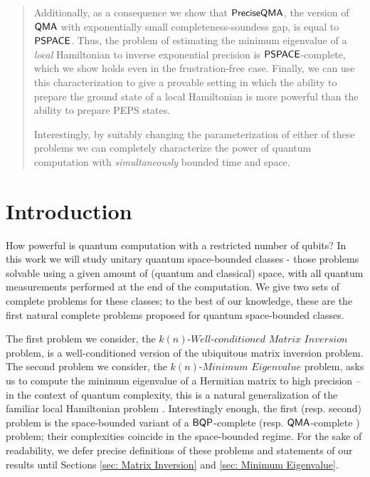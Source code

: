 \documentclass[11pt]{article}
\theoremstyle{definition}
\theoremstyle{remark}
\newcommand\QMA{{\sf{QMA}}}
\newcommand\PSPACE{{\sf{PSPACE}}}
\newcommand\BQP{{\sf{BQP}}}
\newcommand\preciseQMA{{\sf{PreciseQMA}}}
\newcommand\matrixinvert[1]{{\ensuremath{#1}}\textit{-Well-conditioned Matrix Inversion}}
\newcommand\spechamiltonian[1]{\ensuremath{#1}\textit{-Minimum Eigenvalue}}
\begin{document}
\begin{titlepage}
\begin{abstract}
Additionally, as a consequence we show that $\preciseQMA$, the version of $\QMA$ with exponentially small completeness-soundess gap, is equal to $\PSPACE$.  Thus, the problem of estimating the minimum eigenvalue of a \emph{local} Hamiltonian to inverse exponential precision is $\PSPACE$-complete, which we show holds even in the frustration-free case.  Finally, we can use this characterization to give a provable setting in which the ability to prepare the ground state of a local Hamiltonian is more powerful than the ability to prepare PEPS states.

Interestingly, by suitably changing the parameterization of either of these problems we can completely characterize the power of quantum computation with \emph{simultaneously} bounded time and space.   


\end{abstract}
\thispagestyle{empty}
\end{titlepage}
\clearpage
\setcounter{page}{1}
\section{Introduction}
How powerful is quantum computation with a restricted number of qubits? In this work we will study unitary quantum space-bounded classes - those problems solvable using a given amount of (quantum and classical) space, with all quantum measurements performed at the end of the computation. We give two sets of complete problems for these classes; to the best of our knowledge, these are the first natural complete problems proposed for quantum space-bounded classes. 

The first problem we consider, the $\matrixinvert{k(n)}$ problem, is a well-conditioned version of the ubiquitous matrix inversion problem. The second problem we consider, the $\spechamiltonian{k(n)}$ problem, asks us to compute the minimum eigenvalue of a Hermitian matrix to high precision -- in the context of quantum complexity, this is a natural generalization of the familiar local Hamiltonian problem \cite{ksv02}. Interestingly enough, the first (resp. second) problem is the space-bounded variant of a $\BQP$-complete \cite{HHL} (resp. $\QMA$-complete \cite{ksv02}) problem; their complexities coincide in the space-bounded regime. For the sake of readability, we defer precise definitions of these problems and statements of our results until Sections \ref{sec: Matrix Inversion} and \ref{sec: Minimum Eigenvalue}.
\end{document}
